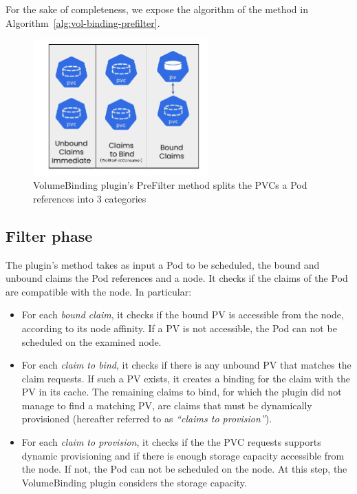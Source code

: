 For the sake of completeness, we expose the algorithm of the 
method in Algorithm~\ref{alg:vol-binding-prefilter}.



\begin{figure}[ht]
      \centering
      \includegraphics[width=0.6\textwidth]{resources/volumebinding-prefilter.pdf}
      \caption{VolumeBinding plugin's PreFilter method splits the PVCs a Pod references into 3 categories}
      \label{figure:volumebinding-prefilter}
\end{figure}

\subsection*{Filter phase}

The  plugin's  method takes as input a Pod to be
scheduled, the bound and unbound claims the Pod references and a node. It checks
if the claims of the Pod are compatible with the node. In particular:

\begin{itemize}
      \tightlist
      \item For each \textit{bound claim}, it checks if the bound PV is
            accessible from the node, according to its node affinity. If a PV is
            not accessible, the Pod can not be scheduled on the examined node.
      \item For each \textit{claim to bind}, it checks if there is any unbound
            PV that matches the claim requests. If such a PV exists, it creates
            a binding for the claim with the PV in its cache. The remaining
            claims to bind, for which the plugin did not manage to find a
            matching PV, are claims that must be dynamically provisioned
            (hereafter referred to as \textit{``claims to provision''}).
      \item For each \textit{claim to provision}, it checks if the
             the PVC requests supports dynamic provisioning and
            if there is enough storage capacity accessible from the node. If
            not, the Pod can not be scheduled on the node. At this step, the
            VolumeBinding plugin considers the storage capacity.
\end{itemize}

